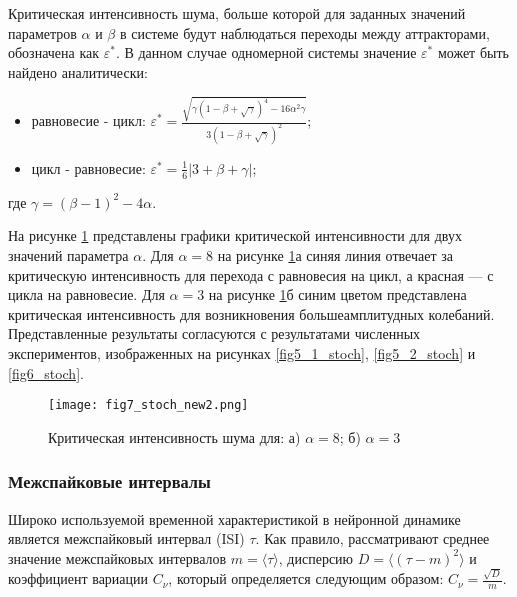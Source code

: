 \documentclass[a4paper, 14pt]{extreport}
\newcommand\abs[1]{\left|#1\right|}
\numberwithin{equation}{section}
\numberwithin{figure}{section}
\numberwithin{table}{section}
\begin{document}
			\newpage

			Критическая интенсивность шума, больше которой для заданных значений параметров $ \alpha $ и $ \beta $ в системе будут наблюдаться переходы между аттракторами, обозначена как $ \varepsilon^{*} $. В данном случае одномерной системы значение $ \varepsilon^{*} $ может быть найдено аналитически:
			\begin{itemize}
				\item равновесие - цикл: $ \varepsilon^{*} = \frac{\sqrt{\gamma (1 - \beta + \sqrt{\gamma})^{4} - 16 \alpha^{2} \gamma}}{3 (1 - \beta + \sqrt{\gamma})^{2}} $;
				\item цикл - равновесие: $ \varepsilon^{*} =\frac{1}{6} \abs{3 + \beta + \gamma} $;
			\end{itemize}
			где $ \gamma = (\beta - 1)^{2} - 4 \alpha $.

			На рисунке \ref{fig7_stoch} представлены графики критической интенсивности для двух значений параметра $ \alpha $. Для $ \alpha = 8 $ на рисунке \ref{fig7_stoch}а синяя линия отвечает за критическую интенсивность для перехода с равновесия на цикл, а красная --- с цикла на равновесие. Для $ \alpha = 3 $ на рисунке \ref{fig7_stoch}б синим цветом представлена критическая интенсивность для возникновения большеамплитудных колебаний. Представленные результаты согласуются с результатами численных экспериментов, изображенных на рисунках \ref{fig5_1_stoch}, \ref{fig5_2_stoch} и \ref{fig6_stoch}. %
			\begin{figure}[h!]
				\begin{center}
					\texttt{[image: fig7\_stoch\_new2.png]}
				\end{center}
				\caption{Критическая интенсивность шума для: а) $ \alpha = 8 $; б) $ \alpha = 3 $}
				\label{fig7_stoch}		
			\end{figure} \vspace{1mm}

			\newpage
			\subsubsection{Межспайковые интервалы}
			\label{stoch_spikes}
            	Широко используемой временной характеристикой в нейронной динамике является межспайковый интервал (ISI) $ \tau $. Как правило, рассматривают среднее значение межспайковых интервалов $ m = \langle\tau\rangle $, дисперсию $ D = \langle(\tau - m)^{2}\rangle $ и коэффициент вариации $ C_{\nu} $, который определяется следующим образом: $ C_{\nu} = \frac{\sqrt{D}}{m} $.
\end{document}
